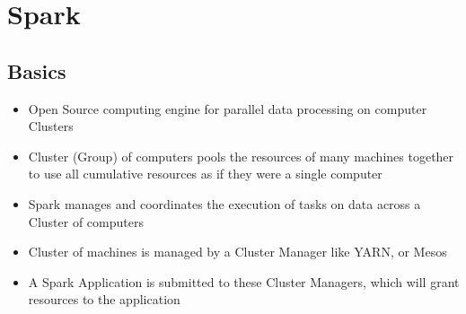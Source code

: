 \documentclass[11pt]{scrartcl}
\begin{document}
\newpage
\section{Spark}
\subsection{Basics}
\begin{itemize}
	\item Open Source computing engine for parallel data processing on computer Clusters
	\item Cluster (Group) of computers pools the resources of many machines together to use all cumulative resources as if they were a single computer
	\item Spark manages and coordinates the execution of tasks on data across a Cluster of computers
	\item Cluster of machines is managed by a Cluster Manager like YARN, or Mesos
	\item A Spark Application is submitted to these Cluster Managers, which will grant resources to the application
\end{itemize}
\end{document}
